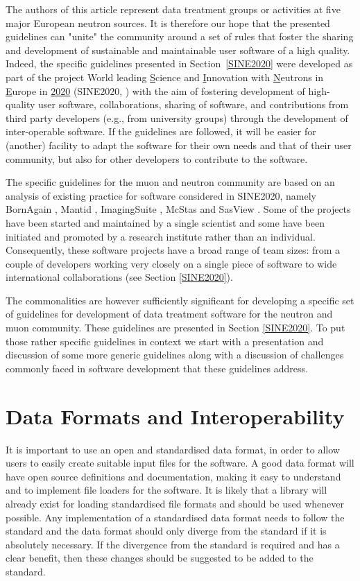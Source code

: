\documentclass[jnr]{iosart2x}
\begin{document}
The authors of this article represent data treatment groups or activities at five major European neutron sources.
It is therefore our hope that the presented guidelines can "unite" the community around a set of rules that foster the sharing and development of sustainable and maintainable user software of a high quality. 
Indeed, the specific guidelines presented in Section~\ref{SINE2020} were developed as part of the project
World leading
\underline{S}cience and 
\underline{I}nnovation with
\underline{N}eutrons in
\underline{E}urope in
\underline{2020} 
(SINE2020, \cite{sine2020}) with the aim of fostering development of high-quality user software,  collaborations, sharing of software, and contributions from third party developers (e.g., from university groups) through the development of inter-operable software. 
If the guidelines are followed, it will be easier for (another) facility to adapt the software for their own needs and that of their user community, but also for other developers to contribute to the software. 

The specific guidelines for the muon and neutron community are based on an analysis of existing practice for software considered in SINE2020, namely  BornAgain \cite{bornagain}, Mantid \cite{mantid}, ImagingSuite \cite{ImagingSuite}, McStas \cite{mcstas} and SasView \cite{sasview}.
Some of the projects have been started and maintained by a single scientist and some have been initiated and promoted by a research institute rather than an individual.
Consequently, these software projects have a broad range of team sizes: from a couple of developers working very closely on a single piece of software to wide international collaborations (see Section \ref{SINE2020}). 

The commonalities are however sufficiently significant for developing a specific set of guidelines for development of data treatment software for the neutron and muon community. 
These guidelines are presented in Section \ref{SINE2020}. 
To put those rather specific guidelines in context we start with a presentation and discussion of some more generic guidelines along with a discussion of challenges commonly faced in software development that these guidelines address.


\section{Data Formats and Interoperability}
\label{Data Formats and Interoperability}

It is important to use an open and standardised data format, in order to allow users to easily create suitable input files for the software.
A good data format will have open source definitions and documentation, making it easy to understand and to implement file loaders for the software.
It is likely that a library will already exist for loading standardised file formats and should be used whenever possible.
Any implementation of a standardised data format needs to follow the standard and
the data format should only diverge from the standard if it is absolutely necessary.
If the divergence from the standard is required and has a clear benefit, then these changes should be suggested to be added to the standard.
\end{document}
